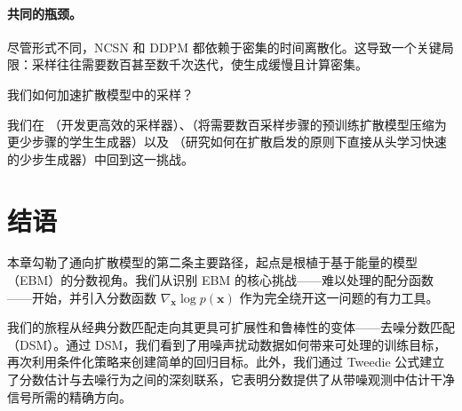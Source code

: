 \paragraph{共同的瓶颈。}
尽管形式不同，NCSN 和 DDPM 都依赖于密集的时间离散化。这导致一个关键局限：采样往往需要数百甚至数千次迭代，使生成缓慢且计算密集。

\begin{question}\label{ques:dm-sampling-slow}
    我们如何加速扩散模型中的采样？
\end{question}

我们在 （开发更高效的采样器）、（将需要数百采样步骤的预训练扩散模型压缩为更少步骤的学生生成器）以及 （研究如何在扩散启发的原则下直接从头学习快速的少步生成器）中回到这一挑战。




\newpage

\section{结语}\label{sec:ch3_cr}



本章勾勒了通向扩散模型的第二条主要路径，起点是根植于基于能量的模型（EBM）的分数视角。我们从识别 EBM 的核心挑战——难以处理的配分函数——开始，并引入分数函数 $\nabla_{\mathbf{x}}\log{p(\mathbf{x})}$ 作为完全绕开这一问题的有力工具。

我们的旅程从经典分数匹配走向其更具可扩展性和鲁棒性的变体——去噪分数匹配（DSM）。通过 DSM，我们看到了用噪声扰动数据如何带来可处理的训练目标，再次利用条件化策略来创建简单的回归目标。此外，我们通过 Tweedie 公式建立了分数估计与去噪行为之间的深刻联系，它表明分数提供了从带噪观测中估计干净信号所需的精确方向。


